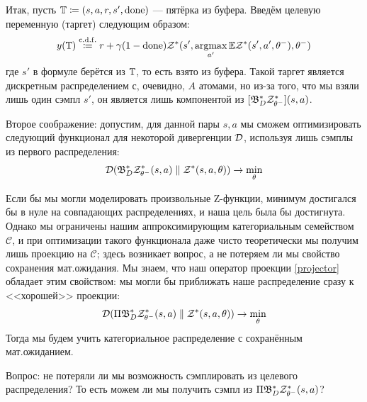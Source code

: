 Итак, пусть $\mathbb{T} \coloneqq (s, a, r, s', \mathrm{done})$ --- пятёрка из буфера. Введём целевую переменную (таргет) следующим образом:
\begin{equation}\label{distributionaltarget}
y(\mathbb{T}) \mathrel{\stackrel{\mathrm{c.d.f.}}\coloneqq} r + \gamma (1 - \mathrm{done}) \mathcal{Z}^*(s', \mathop{\mathrm{argmax}}_{a'} \mathbb{E} \mathcal{Z}^*(s', a', \theta^{-}), \theta^{-})
\end{equation}
где $s'$ в формуле берётся из $\mathbb{T}$, то есть взято из буфера. Такой таргет является дискретным распределением с, очевидно, $A$ атомами, но из-за того, что мы взяли лишь один сэмпл $s'$, он является лишь компонентой из $[\mathfrak{B}^*_D \mathcal{Z}^*_{\theta^-}](s, a)$.

Второе соображение: допустим, для данной пары $s, a$ мы сможем оптимизировать следующий функционал для некоторой дивергенции $\mathcal{D}$, используя лишь сэмплы из первого распределения:
\begin{equation}\label{distributionalopt}
\mathcal{D} (\mathfrak{B}^*_D \mathcal{Z}^*_{\theta^-}(s, a) \parallel \mathcal{Z}^*(s, a, \theta)) \to \min_{\theta}
\end{equation}

Если бы мы могли моделировать произвольные Z-функции, минимум достигался бы в нуле на совпадающих распределениях, и наша цель была бы достигнута. Однако мы ограничены нашим аппроксимирующим категориальным семейством $\mathcal{C}$, и при оптимизации такого функционала даже чисто теоретически мы получим лишь проекцию на $\mathcal{C}$; здесь возникает вопрос, а не потеряем ли мы свойство сохранения мат.ожидания. Мы знаем, что наш оператор проекции \eqref{projector} обладает этим свойством: мы могли бы приближать наше распределение сразу к <<хорошей>> проекции:
$$\mathcal{D} (\Pi \mathfrak{B}^*_D \mathcal{Z}^*_{\theta^-}(s, a) \parallel \mathcal{Z}^*(s, a, \theta)) \to \min_{\theta}$$
Тогда мы будем учить категориальное распределение с сохранённым мат.ожиданием. 

Вопрос: не потеряли ли мы возможность сэмплировать из целевого распределения? То есть можем ли мы получить сэмпл из $\Pi \mathfrak{B}^*_D \mathcal{Z}^*_{\theta^-}(s, a)$?

